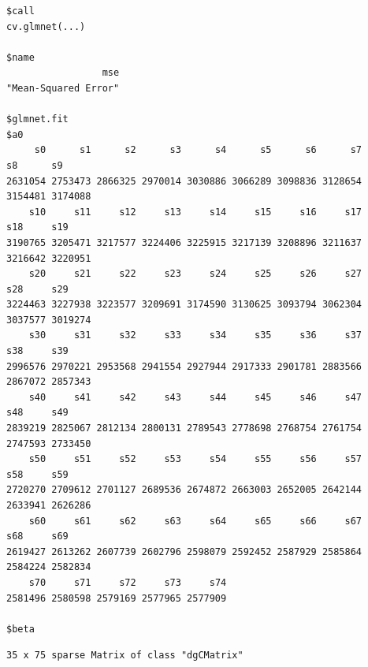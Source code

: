 \documentclass[
]{article}
\begin{document}
\begin{verbatim}
$call
cv.glmnet(...)

$name
                 mse 
"Mean-Squared Error" 

$glmnet.fit
$a0
     s0      s1      s2      s3      s4      s5      s6      s7      s8      s9 
2631054 2753473 2866325 2970014 3030886 3066289 3098836 3128654 3154481 3174088 
    s10     s11     s12     s13     s14     s15     s16     s17     s18     s19 
3190765 3205471 3217577 3224406 3225915 3217139 3208896 3211637 3216642 3220951 
    s20     s21     s22     s23     s24     s25     s26     s27     s28     s29 
3224463 3227938 3223577 3209691 3174590 3130625 3093794 3062304 3037577 3019274 
    s30     s31     s32     s33     s34     s35     s36     s37     s38     s39 
2996576 2970221 2953568 2941554 2927944 2917333 2901781 2883566 2867072 2857343 
    s40     s41     s42     s43     s44     s45     s46     s47     s48     s49 
2839219 2825067 2812134 2800131 2789543 2778698 2768754 2761754 2747593 2733450 
    s50     s51     s52     s53     s54     s55     s56     s57     s58     s59 
2720270 2709612 2701127 2689536 2674872 2663003 2652005 2642144 2633941 2626286 
    s60     s61     s62     s63     s64     s65     s66     s67     s68     s69 
2619427 2613262 2607739 2602796 2598079 2592452 2587929 2585864 2584224 2582834 
    s70     s71     s72     s73     s74 
2581496 2580598 2579169 2577965 2577909 

$beta
\end{verbatim}

\begin{verbatim}
35 x 75 sparse Matrix of class "dgCMatrix"
\end{verbatim}
\end{document}
